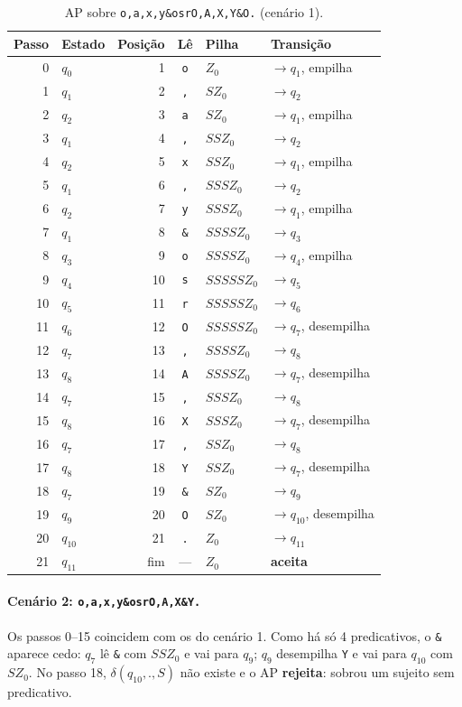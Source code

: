 \documentclass[11pt,a4paper]{article}
\newcommand{\cad}[1]{\texttt{#1}}       %
\begin{document}
{\small
\begin{longtable}{rlrcll}
\caption{AP sobre \cad{o,a,x,y\&osrO,A,X,Y\&O.} (cenário 1).}\\
\toprule
Passo & Estado & Posição & Lê & Pilha & Transição \\
\midrule
\endhead
0 & $q_0$ & 1 & \cad{o} & $Z_0$ & $\to q_1$, empilha \\
1 & $q_1$ & 2 & \cad{,} & $SZ_0$ & $\to q_2$ \\
2 & $q_2$ & 3 & \cad{a} & $SZ_0$ & $\to q_1$, empilha \\
3 & $q_1$ & 4 & \cad{,} & $SSZ_0$ & $\to q_2$ \\
4 & $q_2$ & 5 & \cad{x} & $SSZ_0$ & $\to q_1$, empilha \\
5 & $q_1$ & 6 & \cad{,} & $SSSZ_0$ & $\to q_2$ \\
6 & $q_2$ & 7 & \cad{y} & $SSSZ_0$ & $\to q_1$, empilha \\
7 & $q_1$ & 8 & \cad{\&} & $SSSSZ_0$ & $\to q_3$ \\
8 & $q_3$ & 9 & \cad{o} & $SSSSZ_0$ & $\to q_4$, empilha \\
9 & $q_4$ & 10 & \cad{s} & $SSSSSZ_0$ & $\to q_5$ \\
10 & $q_5$ & 11 & \cad{r} & $SSSSSZ_0$ & $\to q_6$ \\
11 & $q_6$ & 12 & \cad{O} & $SSSSSZ_0$ & $\to q_7$, desempilha \\
12 & $q_7$ & 13 & \cad{,} & $SSSSZ_0$ & $\to q_8$ \\
13 & $q_8$ & 14 & \cad{A} & $SSSSZ_0$ & $\to q_7$, desempilha \\
14 & $q_7$ & 15 & \cad{,} & $SSSZ_0$ & $\to q_8$ \\
15 & $q_8$ & 16 & \cad{X} & $SSSZ_0$ & $\to q_7$, desempilha \\
16 & $q_7$ & 17 & \cad{,} & $SSZ_0$ & $\to q_8$ \\
17 & $q_8$ & 18 & \cad{Y} & $SSZ_0$ & $\to q_7$, desempilha \\
18 & $q_7$ & 19 & \cad{\&} & $SZ_0$ & $\to q_9$ \\
19 & $q_9$ & 20 & \cad{O} & $SZ_0$ & $\to q_{10}$, desempilha \\
20 & $q_{10}$ & 21 & \cad{.} & $Z_0$ & $\to q_{11}$ \\
21 & $q_{11}$ & fim & --- & $Z_0$ & \textbf{aceita} \\
\bottomrule
\end{longtable}}

\paragraph{Cenário 2: \cad{o,a,x,y\&osrO,A,X\&Y.}} Os passos 0--15 coincidem com os do cenário 1. Como há só 4 predicativos, o \cad{\&} aparece cedo: $q_7$ lê \cad{\&} com $SSZ_0$ e vai para $q_9$; $q_9$ desempilha \cad{Y} e vai para $q_{10}$ com $SZ_0$. No passo 18, $\delta(q_{10},\cad{.},S)$ não existe e o AP \textbf{rejeita}: sobrou um sujeito sem predicativo.
\end{document}
